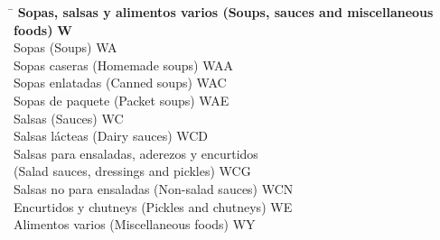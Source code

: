 \begin{small}
    \vspace{-1.25cm}
    
    \begin{tabbing}
    \hspace{15cm} \= \hspace{0cm} \kill
        \textbf{Sopas, salsas y alimentos varios (Soups, sauces and miscellaneous foods)} \> \textbf{W} \\
            \hspace{0.5cm}Sopas (Soups) \> WA \\
                \hspace{1cm}Sopas caseras (Homemade soups) \> WAA \\
                \hspace{1cm}Sopas enlatadas (Canned soups) \> WAC \\
                \hspace{1cm}Sopas de paquete (Packet soups) \> WAE \\
            \hspace{0.5cm}Salsas (Sauces) \> WC \\
                \hspace{1cm}Salsas lácteas (Dairy sauces) \> WCD \\
                \hspace{1cm}Salsas para ensaladas, aderezos y encurtidos \\
                \hspace{1cm}(Salad sauces, dressings and pickles) \> WCG \\
                \hspace{1cm}Salsas no para ensaladas (Non-salad sauces) \> WCN \\
            \hspace{0.5cm}Encurtidos y chutneys (Pickles and chutneys) \> WE \\
            \hspace{0.5cm}Alimentos varios (Miscellaneous foods) \> WY \\
    \end{tabbing}
\end{small}